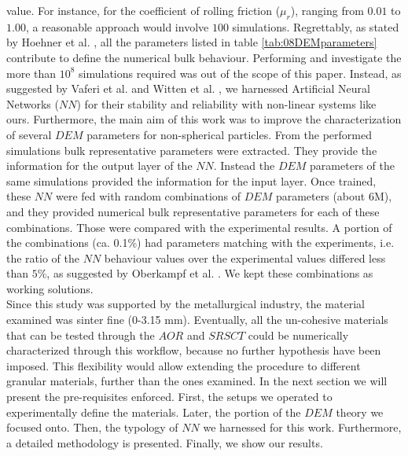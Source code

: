 value.
For instance, for the coefficient of rolling friction ($\mu_r$), ranging from
$0.01$ to $1.00$, a reasonable approach would involve $100$ simulations.
%
Regrettably, as stated by Hoehner et al. \cite{RefWorks:86}, all the parameters listed in table \ref{tab:08DEMparameters}
contribute to define the numerical bulk behaviour. Performing and investigate the 
more than $10^8$ simulations required was out of the scope of this paper.
Instead, as suggested by Vaferi et al. \cite{RefWorks:150} and Witten et al.
\cite{RefWorks:174}, we harnessed Artificial Neural Networks ($NN$) for their
stability and reliability with non-linear systems like ours.
Furthermore, the main aim of this work was to improve the characterization 
of several $DEM$ parameters for non-spherical particles. 
From the performed simulations bulk representative parameters were extracted. 
They provide the information for the output layer of the $NN$. Instead the $DEM$ 
parameters of the same simulations provided the information for the input layer. 
Once trained, these $NN$ were fed with random combinations of $DEM$ parameters
(about 6M), and they provided numerical bulk representative parameters for each
of these combinations.
Those were compared with the experimental results. A portion of the combinations
(ca. 0.1\%) had parameters matching with the experiments, i.e. the ratio of the $NN$ behaviour
values over the experimental values differed less than $5\%$, as suggested by
Oberkampf et al. \cite{RefWorks:160}.
We kept these combinations as working solutions. \\
Since this study was supported by the metallurgical industry, the material examined was  sinter fine (0-3.15 mm).
Eventually, all the un-cohesive materials that can be tested through the $AOR$
and $SRSCT$ could be numerically characterized through this workflow, because no
further hypothesis have been imposed.
This flexibility would allow extending the procedure to different granular materials, further than the ones examined.
In the next section we will present the pre-requisites enforced. 
First, the setups we operated to experimentally define the materials. 
Later, the portion of the $DEM$ theory we focused onto. 
Then, the typology of $NN$ we harnessed for this work. 
Furthermore, a detailed methodology is presented. Finally, we show our results.

